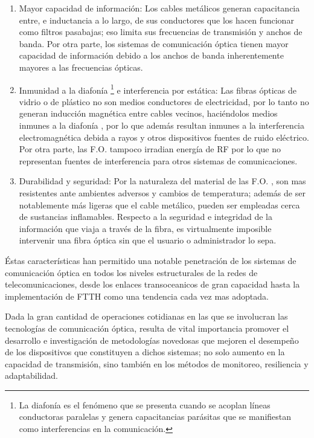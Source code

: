 \begin{enumerate}
    \item Mayor capacidad de información: 
        Los cables metálicos generan capacitancia entre, e inductancia a lo largo, de sus conductores que los hacen funcionar como filtros pasabajas; eso limita sus frecuencias de transmisión y anchos de banda. Por otra parte, los sistemas de comunicación óptica tienen mayor capacidad de información debido a los anchos de banda inherentemente mayores a las frecuencias ópticas. 
    
    \item Inmunidad a la diafonía \footnote{La diafonía es el fenómeno que se presenta cuando se acoplan líneas conductoras paralelas y genera capacitancias parásitas que se manifiestan como interferencias en la comunicación.} e interferencia por estática: 
        Las fibras ópticas de vidrio o de plástico no son medios conductores de electricidad, por lo tanto no generan inducción magnética entre cables vecinos, haciéndolos medios inmunes a la diafonía \citep{nerivela}, por lo que además resultan inmunes a la interferencia electromagnética debida a rayos y otros dispositivos fuentes de ruido eléctrico. Por otra parte, las F.O. tampoco irradian energía de RF por lo que no representan fuentes de interferencia para otros sistemas de comunicaciones. 

    \item Durabilidad y seguridad: 
        Por la naturaleza del material de las F.O. , son mas resistentes ante ambientes adversos y cambios de temperatura; además de ser notablemente más ligeras que el cable metálico, pueden ser empleadas cerca de sustancias inflamables. Respecto a la seguridad e integridad de la información que viaja a través de la fibra, es virtualmente imposible intervenir una fibra óptica sin que el usuario o administrador lo sepa.
    
\end{enumerate}

Éstas características han permitido una notable penetración de los sistemas de comunicación óptica en todos los niveles estructurales de la redes de telecomunicaciones, desde los enlaces transoceanicos de gran capacidad hasta la implementación de FTTH como una tendencia cada vez mas adoptada.

Dada la gran cantidad de operaciones cotidianas en las que se involucran las tecnologías de comunicación óptica, resulta de vital importancia promover el desarrollo e investigación de metodologías novedosas que mejoren el desempeño de los dispositivos que constituyen a dichos sistemas; no solo aumento en la capacidad de transmisión, sino también en los métodos de monitoreo, resiliencia y adaptabilidad.


